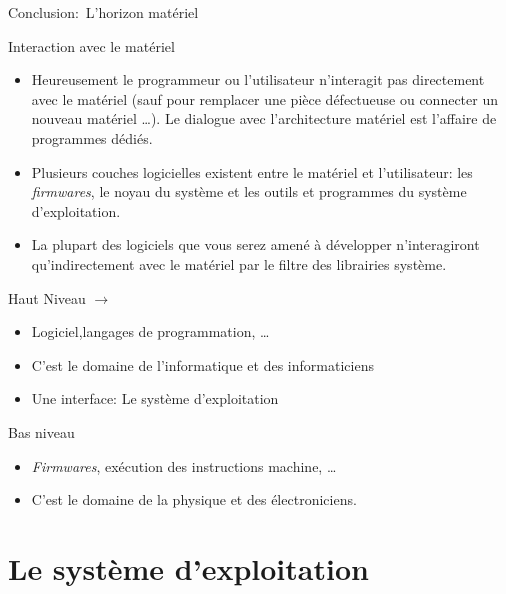 \begin{frame}{Conclusion:~L'horizon matériel}
  \begin{block}{Interaction avec le matériel}
    \begin{itemize}
    \item Heureusement le programmeur ou l'utilisateur n'interagit pas
      directement avec le matériel (sauf pour remplacer une pièce
      défectueuse ou connecter un nouveau matériel \dots). Le dialogue
      avec l'architecture matériel est l'affaire de programmes dédiés.
    \item Plusieurs couches logicielles existent entre le matériel et
      l'utilisateur: les \textit{firmwares}, le noyau du système et les
      outils et programmes du système d'exploitation.
    \item La plupart des logiciels que vous serez amené à développer
      n'interagiront qu'indirectement avec le matériel par le filtre des
      librairies système.
    \end{itemize}
  \end{block}
  \begin{alertblock}{Haut Niveau $\rightarrow$}
    \begin{itemize}
    \item Logiciel,langages de programmation, \dots
    \item[\dialoginformation] C'est le domaine de l'informatique et des informaticiens
    \item[\dialogsystem] Une interface: Le système d'exploitation
    \end{itemize}
  \end{alertblock}
  \begin{alertblock}{Bas niveau}
    \begin{itemize}
    \item \textit{Firmwares}, exécution des instructions machine,
      \dots
    \item C'est le domaine de la physique et des électroniciens.
    \end{itemize}
  \end{alertblock}
\end{frame}

\section{Le système d'exploitation}
\label{sec:OSGeneralites}
